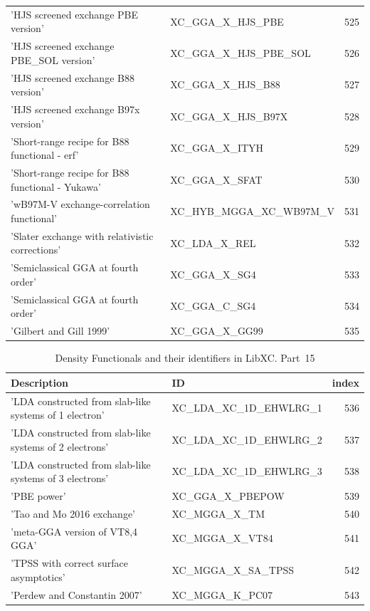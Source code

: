 \documentclass[final,12pt,makeidx,DIV=calc]{article}
\begin{document}
{{{{{{\begin{table}[!h]
\begin{center}
\begin{tabular}{llr}
  'HJS screened exchange PBE version' & XC\_GGA\_X\_HJS\_PBE  &525\\
  'HJS screened exchange PBE\_SOL version' & XC\_GGA\_X\_HJS\_PBE\_SOL  &526\\
  'HJS screened exchange B88 version' & XC\_GGA\_X\_HJS\_B88  &527\\
  'HJS screened exchange B97x version' & XC\_GGA\_X\_HJS\_B97X  &528\\
  'Short-range recipe for B88 functional - erf' & XC\_GGA\_X\_ITYH  &529\\
  'Short-range recipe for B88 functional - Yukawa' & XC\_GGA\_X\_SFAT  &530\\
  'wB97M-V exchange-correlation functional' & XC\_HYB\_MGGA\_XC\_WB97M\_V  &531\\
  'Slater exchange with relativistic corrections' & XC\_LDA\_X\_REL  &532\\
  'Semiclassical GGA at fourth order' & XC\_GGA\_X\_SG4  &533\\
  'Semiclassical GGA at fourth order' & XC\_GGA\_C\_SG4  &534\\
  'Gilbert and Gill 1999' & XC\_GGA\_X\_GG99  &535\\
\end{tabular}
\end{center}
\end{table}

\begin{table}[!h]
\caption{Density Functionals and their identifiers in LibXC. Part~15}
\begin{center}
\begin{tabular}{llr}
\hline
\hline
Description & ID & index\\
\hline
  'LDA constructed from slab-like systems of 1 electron' & XC\_LDA\_XC\_1D\_EHWLRG\_1  &536\\
  'LDA constructed from slab-like systems of 2 electrons' & XC\_LDA\_XC\_1D\_EHWLRG\_2  &537\\
  'LDA constructed from slab-like systems of 3 electrons' & XC\_LDA\_XC\_1D\_EHWLRG\_3  &538\\
  'PBE power' & XC\_GGA\_X\_PBEPOW  &539\\
  'Tao and Mo 2016 exchange' & XC\_MGGA\_X\_TM  &540\\
  'meta-GGA version of VT{8,4} GGA' & XC\_MGGA\_X\_VT84  &541\\
  'TPSS with correct surface asymptotics' & XC\_MGGA\_X\_SA\_TPSS  &542\\
  'Perdew and Constantin 2007' & XC\_MGGA\_K\_PC07  &543\\
\end{tabular}
\end{center}
\end{table}

}}}}}}
\end{document}

